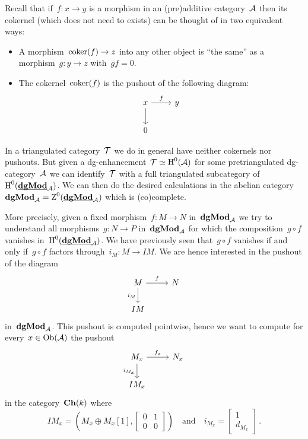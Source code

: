 \documentclass[a4paper,10pt]{scrartcl}
\begin{document}
Recall that if~$f \colon x \to y$ is a morphism in an (pre)additive category~$\mathcal{A}$ then its cokernel (which does not need to exists) can be thought of in two equivalent ways:
\begin{itemize}
  \item
    A morphism~$\operatorname{coker}(f) \to z$ into any other object is \enquote{the same} as a morphism~$g \colon y \to z$ with~$g f = 0$.
  \item
    The cokernel~$\operatorname{coker}(f)$ is the pushout of the following diagram:
    \[
      \begin{tikzcd}
        x
        \arrow{r}[above]{f}
        \arrow{d}
        &
        y
        \\
        0
        &
        {}
      \end{tikzcd}
    \]
\end{itemize}

In a triangulated category~$\mathcal{T}$ we do in general have neither cokernels nor pushouts.
But given a dg-enhancement~$\mathcal{T} \simeq \operatorname{H}^0(\mathcal{A})$ for some pretriangulated dg-category~$\mathcal{A}$ we can identify~$\mathcal{T}$ with a full triangulated subcategory of~$\operatorname{H}^0(\underline{\smash{\mathbf{dgMod}}}_{\mathcal{A}})$.
We can then do the desired calculations in the abelian category~$\mathbf{dgMod}_{\mathcal{A}} = \operatorname{Z}^0(\underline{\smash{\mathbf{dgMod}}}_{\mathcal{A}})$ which is (co)complete.

More precisely, given a fixed morphism~$f \colon M \to N$ in~$\mathbf{dgMod}_{\mathcal{A}}$ we try to understand all morphisms~$g \colon N \to P$ in~$\mathbf{dgMod}_{\mathcal{A}}$ for which the composition~$g \circ f$ vanishes in~$\operatorname{H}^0(\underline{\smash{\mathbf{dgMod}}}_{\mathcal{A}})$.
We have previously seen that~$g \circ f$ vanishes if and only if~$g \circ f$ factors through~$i_M \colon M \to IM$.
We are hence interested in the pushout of the diagram
\[
  \begin{tikzcd}
    M
    \arrow{r}[above]{f}
    \arrow{d}[left]{i_M}
    &
    N
    \\
    IM
    &
    {}
  \end{tikzcd}
\]
in~$\mathbf{dgMod}_{\mathcal{A}}$.
This pushout is computed pointwise, hence we want to compute for every~$x \in \operatorname{Ob}(\mathcal{A})$ the pushout
\[
  \begin{tikzcd}
    M_x
    \arrow{r}[above]{f_x}
    \arrow{d}[left]{i_{M_x}}
    &
    N_x
    \\
    I M_x
    &
    {}
  \end{tikzcd}
\]
in the category~$\mathbf{Ch}(k)$ where
\[
  I M_x
  =
  \left(
    M_x \oplus M_x[1],
    \begin{bmatrix}
      0 & 1 \\
      0 & 0
    \end{bmatrix}
  \right)
  \quad\text{and}\quad
  i_{M_x}
  =
  \begin{bmatrix}
    1 \\
    d_{M_x}
  \end{bmatrix} \,.
\]
\end{document}
